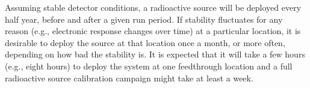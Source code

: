 


Assuming stable detector conditions, a radioactive source will be deployed every half year, before and after a given run period.
If stability fluctuates for any reason (e.g., electronic response changes over time) at a particular location, it is desirable to deploy the source at that location once a month, or more often, depending on how bad the stability is. It is expected that it will take a few hours (e.g., eight hours) to deploy the system at one feedthrough location and a full radioactive source calibration campaign might take at least a week.

